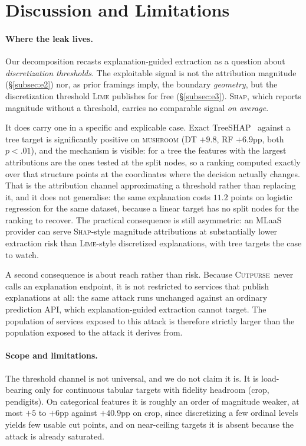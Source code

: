 \documentclass[sigconf,anonymous,review]{acmart}
\newcommand{\sys}{\textsc{Cutpurse}}
\begin{document}
\section{Discussion and Limitations}
\label{sec:discussion}
\paragraph{Where the leak lives.} Our decomposition recasts explanation-guided extraction as a
question about \emph{discretization thresholds}. The exploitable signal is not the attribution magnitude
(\S\ref{subsec:e2}) nor, as prior framings imply, the boundary \emph{geometry}, but the discretization
threshold \textsc{Lime} publishes for free (\S\ref{subsec:e3}). \textsc{Shap}, which reports magnitude
without a threshold, carries no comparable signal \emph{on average}.

It does carry one in a specific and explicable case. Exact
TreeSHAP~\cite{lundberg2020treeshap} against a tree target is
significantly positive on \textsc{mushroom} (DT $+9.8$, RF $+6.9$pp, both $p{<}.01$), and the
mechanism is visible: for a tree the features with the largest attributions are
the ones tested at the split nodes, so a ranking computed exactly over that structure points at the
coordinates where the decision actually changes. That is the attribution channel approximating a
threshold rather than replacing it, and it does not generalise: the same explanation costs
$11.2$ points on logistic regression for the same dataset, because a linear target has no split nodes
for the ranking to recover. The practical consequence is still asymmetric: an MLaaS provider can serve
\textsc{Shap}-style magnitude attributions at substantially lower extraction risk than
\textsc{Lime}-style discretized explanations, with tree targets the case to watch.

A second consequence is about reach rather than risk. Because \sys\ never calls an explanation
endpoint, it is not restricted to services that publish explanations at all: the same attack runs
unchanged against an ordinary prediction API, which explanation-guided extraction cannot target. The
population of services exposed to this attack is therefore strictly larger than the population exposed
to the attack it derives from.

\paragraph{Scope and limitations.} The threshold channel is not universal, and we do not claim it is.
It is load-bearing only for continuous tabular targets with fidelity headroom (crop, pendigits). On
categorical features it is roughly an order of magnitude weaker, at most $+5$ to $+6$pp against
$+40.9$pp on crop, since discretizing a few ordinal levels yields few usable cut points, and on
near-ceiling targets it is absent because the attack is already saturated.
\end{document}
